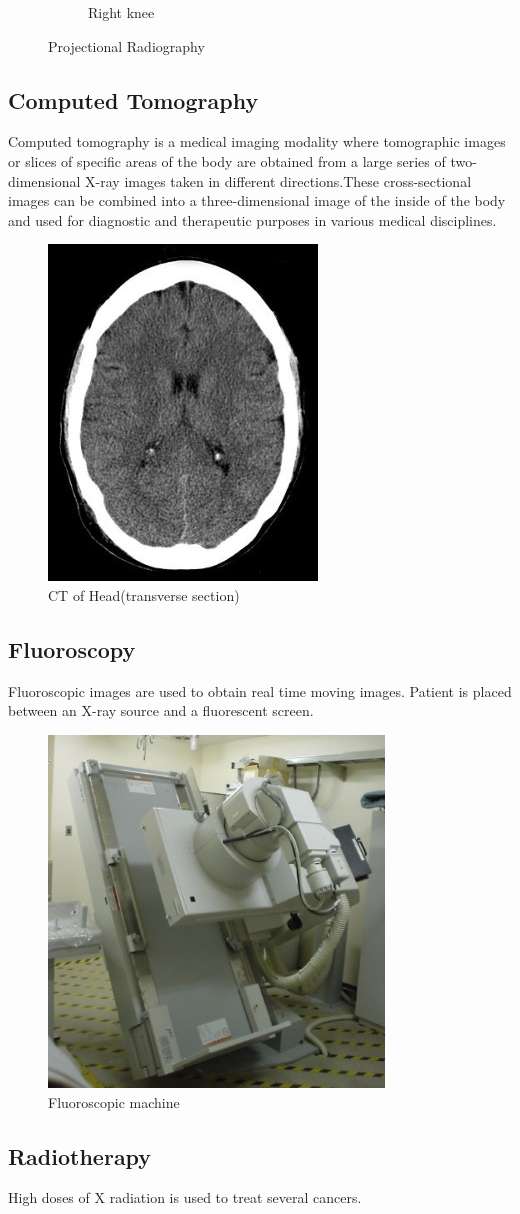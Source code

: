 \documentclass[12pt]{article}
\begin{document}
\begin{figure}[h!]
\begin{subfigure}[b]{0.4\linewidth}
    \caption{Right knee}
  \end{subfigure}
  \caption{Projectional Radiography}
  \label{fig:Projectional Radiography}
\end{figure}
\subsection{Computed Tomography}
Computed tomography is a medical imaging modality where tomographic images or slices of specific areas of the body are obtained from a large series of two-dimensional X-ray images taken in different directions.These cross-sectional images can be combined into a three-dimensional image of the inside of the body and used for diagnostic and therapeutic purposes in various medical disciplines.

\begin{figure}[h!]
  \centering
  \includegraphics[width=0.170935\linewidth]{CT.jpg}
  \caption{\small{CT of Head(transverse section)}}
  \label{fig:CT}
\end{figure}

\subsection{Fluoroscopy}
Fluoroscopic images are used to obtain real time moving images. Patient is placed between an X-ray source and a fluorescent screen. 
\begin{figure}[h!]
  \centering
  \includegraphics[width=0.4\linewidth]{fcopy.jpg}
  \caption{\small{Fluoroscopic machine}}
  \label{fig:FC}
\end{figure}

\subsection{Radiotherapy}
High doses of X radiation is used to treat several cancers. 
\end{document}
